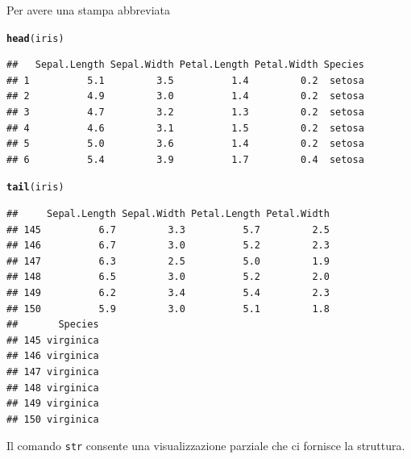 \documentclass[onecolumn,12pt]{book}\usepackage[]{graphicx}\usepackage[]{color}
\makeatletter
\newcommand{\hlstd}[1]{\textcolor[rgb]{0.345,0.345,0.345}{#1}}%
\newcommand{\hlkwd}[1]{\textcolor[rgb]{0.737,0.353,0.396}{\textbf{#1}}}%
\newenvironment{kframe}{%
 \def\at@end@of@kframe{}%
 \ifinner\ifhmode%
  \def\at@end@of@kframe{\end{minipage}}%
  \begin{minipage}{\columnwidth}%
 \fi\fi%
 \def\FrameCommand##1{\hskip\@totalleftmargin \hskip-\fboxsep
 \colorbox{shadecolor}{##1}\hskip-\fboxsep
     \hskip-\linewidth \hskip-\@totalleftmargin \hskip\columnwidth}%
 \MakeFramed {\advance\hsize-\width
   \@totalleftmargin\z@ \linewidth\hsize
   \@setminipage}}%
 {\par\unskip\endMakeFramed%
 \at@end@of@kframe}
\newenvironment{knitrout}{}{} %
\makeatother
\begin{document}
Per avere una stampa abbreviata

\begin{knitrout}
\color{fgcolor}\begin{kframe}
\begin{alltt}
\hlkwd{head}\hlstd{(iris)}
\end{alltt}
\begin{verbatim}
##   Sepal.Length Sepal.Width Petal.Length Petal.Width Species
## 1          5.1         3.5          1.4         0.2  setosa
## 2          4.9         3.0          1.4         0.2  setosa
## 3          4.7         3.2          1.3         0.2  setosa
## 4          4.6         3.1          1.5         0.2  setosa
## 5          5.0         3.6          1.4         0.2  setosa
## 6          5.4         3.9          1.7         0.4  setosa
\end{verbatim}
\begin{alltt}
\hlkwd{tail}\hlstd{(iris)}
\end{alltt}
\begin{verbatim}
##     Sepal.Length Sepal.Width Petal.Length Petal.Width
## 145          6.7         3.3          5.7         2.5
## 146          6.7         3.0          5.2         2.3
## 147          6.3         2.5          5.0         1.9
## 148          6.5         3.0          5.2         2.0
## 149          6.2         3.4          5.4         2.3
## 150          5.9         3.0          5.1         1.8
##       Species
## 145 virginica
## 146 virginica
## 147 virginica
## 148 virginica
## 149 virginica
## 150 virginica
\end{verbatim}
\end{kframe}
\end{knitrout}

Il comando \texttt{str} consente una visualizzazione parziale che ci fornisce la struttura.
 
\end{document}
